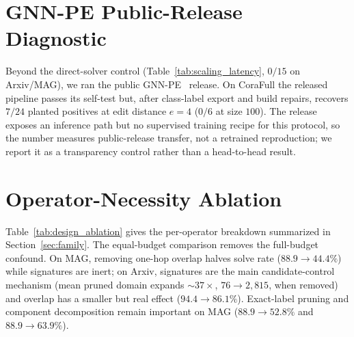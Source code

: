 \documentclass[sigconf, nonacm]{acmart}
\begin{document}
\section{GNN-PE Public-Release Diagnostic}
\label{app:gnnpe}

Beyond the direct-solver control (Table~\ref{tab:scaling_latency}, $0/15$ on Arxiv/MAG), we ran the public GNN-PE~\cite{ref_gnnpe} release. On CoraFull the released pipeline passes its self-test but, after class-label export and build repairs, recovers $7/24$ planted positives at edit distance $e{=}4$ ($0/6$ at size $100$). The release exposes an inference path but no supervised training recipe for this protocol, so the number measures public-release transfer, not a retrained reproduction; we report it as a transparency control rather than a head-to-head result.

\section{Operator-Necessity Ablation}
\label{app:design}

Table~\ref{tab:design_ablation} gives the per-operator breakdown summarized in Section~\ref{sec:family}. The equal-budget comparison removes the full-budget confound. On MAG, removing one-hop overlap halves solve rate ($88.9{\to}44.4\%$) while signatures are inert; on Arxiv, signatures are the main candidate-control mechanism (mean pruned domain expands ${\sim}37\times$, $76{\to}2{,}815$, when removed) and overlap has a smaller but real effect ($94.4{\to}86.1\%$). Exact-label pruning and component decomposition remain important on MAG ($88.9{\to}52.8\%$ and $88.9{\to}63.9\%$).

\begin{table}[t]
\centering
\caption{\textbf{Operator-necessity ablation at matched half-partition budgets.} The shared diagnostic has 48 queries per dataset; solve/candidate statistics use its 36 planted positives (MAG at $K{=}1{,}000/2{,}000$, Arxiv at $K{=}100/200$).}
\label{tab:design_ablation}
\small
\setlength{\tabcolsep}{6pt}
\end{table}
\end{document}
